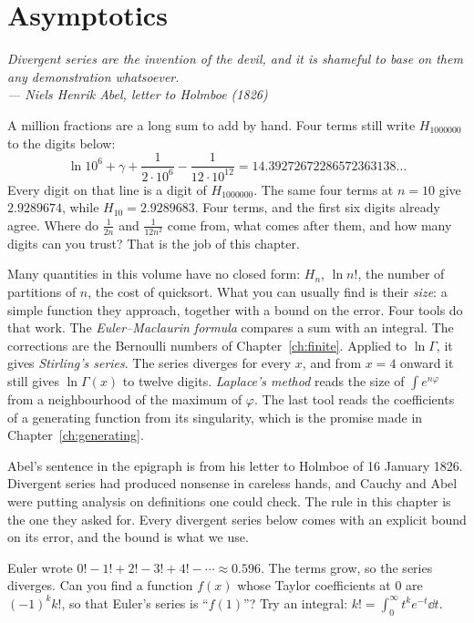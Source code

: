 \chapter{Asymptotics}\label{ch:asymptotics}

\begin{center}\itshape
Divergent series are the invention of the devil, and it is shameful to base on them any demonstration whatsoever.\\
\upshape --- Niels Henrik Abel, letter to Holmboe (1826)
\end{center}

A million fractions are a long sum to add by hand. Four terms still write $H_{1000000}$ to the digits below:
\[
\ln10^6+\gamma+\frac1{2\cdot10^6}-\frac1{12\cdot10^{12}}=14.39272672286572363138\ldots
\]
Every digit on that line is a digit of $H_{1000000}$. The same four terms at $n=10$ give $2.9289674$, while $H_{10}=2.9289683$. Four terms, and the first six digits already agree. Where do $\frac1{2n}$ and $\frac1{12n^2}$ come from, what comes after them, and how many digits can you trust? That is the job of this chapter.

Many quantities in this volume have no closed form: $H_n$, $\ln n!$, the number of partitions of $n$, the cost of quicksort. What you can usually find is their \emph{size}: a simple function they approach, together with a bound on the error. Four tools do that work. The \emph{Euler--Maclaurin formula} compares a sum with an integral. The corrections are the Bernoulli numbers of Chapter~\ref{ch:finite}. Applied to $\ln\Gamma$, it gives \emph{Stirling's series}. The series diverges for every $x$, and from $x=4$ onward it still gives $\ln\Gamma(x)$ to twelve digits. \emph{Laplace's method} reads the size of $\int e^{n\varphi}$ from a neighbourhood of the maximum of $\varphi$. The last tool reads the coefficients of a generating function from its singularity, which is the promise made in Chapter~\ref{ch:generating}.


Abel's sentence in the epigraph is from his letter to Holmboe of 16 January 1826. Divergent series had produced nonsense in careless hands, and Cauchy and Abel were putting analysis on definitions one could check. The rule in this chapter is the one they asked for. Every divergent series below comes with an explicit bound on its error, and the bound is what we use.

\begin{think}
Euler wrote $0!-1!+2!-3!+4!-\cdots\approx0.596$. The terms grow, so the series diverges. Can you find a function $f(x)$ whose Taylor coefficients at $0$ are $(-1)^kk!$, so that Euler's series is ``$f(1)$''? Try an integral: $k!=\int_0^\infty t^ke^{-t}\dd t$.
\end{think}

